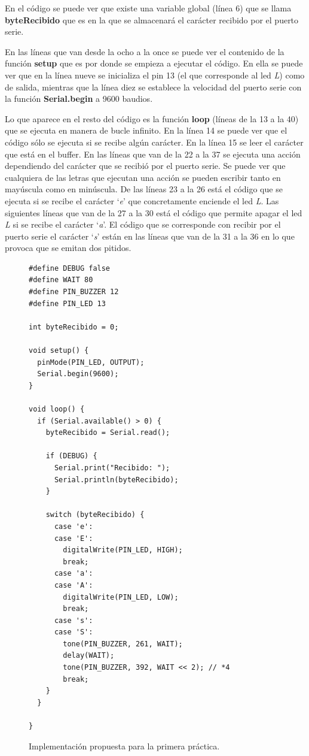 \documentclass{article}
\begin{document}
	En el código se puede ver que existe una variable global (línea 6) que se llama \textbf{byteRecibido} que es en la que se almacenará el carácter recibido por el puerto serie.
	
	En las líneas que van desde la ocho a la once se puede ver el contenido de la función \textbf{setup} que es por donde se empieza a ejecutar el código. En ella se puede ver que en la línea nueve se inicializa el pin 13 (el que corresponde al led \emph{L}) como de salida, mientras que la línea diez se establece la velocidad del puerto serie con la función \textbf{Serial.begin} a 9600 baudios.

	Lo que aparece en el resto del código es la función \textbf{loop} (líneas de la 13 a la 40) que se ejecuta en manera de bucle infinito. En la línea 14 se puede ver que el código sólo se ejecuta si se recibe algún carácter. En la línea 15 se leer el carácter que está en el buffer. En las líneas que van de la 22 a la 37 se ejecuta una acción dependiendo del carácter que se recibió por el puerto serie. Se puede ver que cualquiera de las letras que ejecutan una acción se pueden escribir tanto en mayúscula como en minúscula. De las líneas 23 a la 26 está el código que se ejecuta si se recibe el carácter `\textit{e}' que concretamente enciende el led \emph{L}. Las siguientes líneas que van de la 27 a la 30 está el código que permite apagar el led \emph{L} si se recibe el carácter `\textit{a}'. El código que se corresponde con recibir por el puerto serie el carácter `\textit{s}' están en las líneas que van de la 31 a la 36 en lo que provoca que se emitan dos pitidos.
	

\begin{figure}[h]
	\begin{lstlisting}[style=C]
#define DEBUG false
#define WAIT 80
#define PIN_BUZZER 12
#define PIN_LED 13

int byteRecibido = 0;

void setup() {
  pinMode(PIN_LED, OUTPUT);
  Serial.begin(9600);
}

void loop() {
  if (Serial.available() > 0) {
    byteRecibido = Serial.read();

    if (DEBUG) {
      Serial.print("Recibido: ");
      Serial.println(byteRecibido);
    }
    
    switch (byteRecibido) {
      case 'e':
      case 'E':
        digitalWrite(PIN_LED, HIGH);
        break;
      case 'a':
      case 'A':
        digitalWrite(PIN_LED, LOW);
        break;
      case 's':
      case 'S':
        tone(PIN_BUZZER, 261, WAIT);
        delay(WAIT);
        tone(PIN_BUZZER, 392, WAIT << 2); // *4
        break; 
    }
  }

}
	\end{lstlisting}
	\caption{Implementación propuesta para la primera práctica.}
	\label{cod:p1:exercise}
\end{figure}
\end{document}
